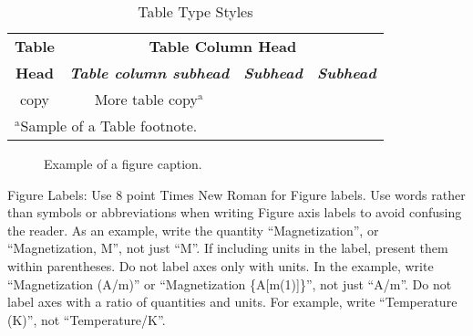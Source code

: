 \documentclass[conference]{IEEEtran}
\begin{document}
\begin{table}[htbp]
    \caption{Table Type Styles}
    \begin{center}
        \begin{tabular}{|c|c|c|c|}
            \hline
            \textbf{Table} & \multicolumn{3}{|c|}{\textbf{Table Column Head}}                                                         \\
            \cline{2-4}
            \textbf{Head}  & \textbf{\textit{Table column subhead}}           & \textbf{\textit{Subhead}} & \textbf{\textit{Subhead}} \\
            \hline
            copy           & More table copy$^{\mathrm{a}}$                   &                           &                           \\
            \hline
            \multicolumn{4}{l}{$^{\mathrm{a}}$Sample of a Table footnote.}
        \end{tabular}
        \label{tab1}
    \end{center}
\end{table}

\begin{figure}[htbp]
    \caption{Example of a figure caption.}
    \label{fig}
\end{figure}

Figure Labels: Use 8 point Times New Roman for Figure labels. Use words
rather than symbols or abbreviations when writing Figure axis labels to
avoid confusing the reader. As an example, write the quantity
``Magnetization'', or ``Magnetization, M'', not just ``M''. If including
units in the label, present them within parentheses. Do not label axes only
with units. In the example, write ``Magnetization (A/m)'' or ``Magnetization
\{A[m(1)]\}'', not just ``A/m''. Do not label axes with a ratio of
quantities and units. For example, write ``Temperature (K)'', not
``Temperature/K''.
\end{document}
